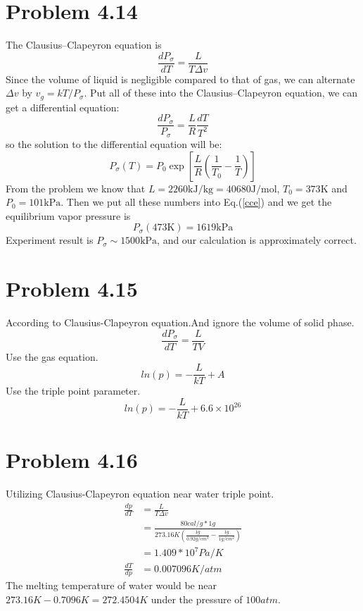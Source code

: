 \documentclass{article}
\begin{document}
\section*{Problem 4.14}
The Clausius–Clapeyron equation is
$$
\frac{dP_\sigma}{dT} = \frac{L}{T\Delta v}
$$
Since the volume of liquid is negligible compared to that of gas, we can alternate $\Delta v$ by $v_g = kT/P_\sigma$. Put all of these into the Clausius–Clapeyron equation, we can get a differential equation:
\begin{equation}
\frac{dP_\sigma}{P_\sigma} = \frac{L}{R}\frac{dT}{T^2}
\end{equation}
so the solution to the differential equation will be:
\begin{equation}\label{cce}
P_\sigma(T) = P_0\exp\left[\frac{L}{R}\left(\frac{1}{T_0}-\frac{1}{T}\right)\right]
\end{equation}
From the problem we know that $L = 2260\mathrm{kJ/kg} = 40680\mathrm{J/mol}$, $T_0 =373\mathrm{K}$ and $P_0 = 101\mathrm{kPa}$. Then we put all these numbers into Eq.(\ref{cce}) and we get the equilibrium vapor pressure is
$$
P_\sigma(473\mathrm{K}) = 1619\mathrm{kPa}
$$
Experiment result is $P_\sigma \sim 1500\mathrm{kPa}$, and our calculation is approximately correct.






\section*{Problem 4.15} %
\label{sec:problem_4_15}
	

	According to Clausius-Clapeyron equation.And ignore the volume of solid phase.
	$$\frac{dP_{\sigma}}{dT}=\frac{L}{TV}$$
	Use the gas equation.
	$$ln(p)=-\frac{L}{kT}+A$$
	Use the triple point parameter.
	$$ln(p)=-\frac{L}{kT}+6.6\times10^{26}$$

\section*{Problem 4.16}
	Utilizing Clausius-Clapeyron equation near water triple point.
	\begin{align}
		\frac{dp}{dT}&=\frac{L}{T\Delta v}\\
		&=\frac{80cal/g*1g}{273.16K (\frac{1g}{0.92g/cm^3}-\frac{1g}{1g/cm^2})}\\
		&=1.409*10^7 Pa/K\\
		\frac{dT}{dp}&=0.007096 K/atm
	\end{align}
	The melting temperature of water would be near $273.16K-0.7096K=272.4504K$ under the pressure of $100atm$.\\
\end{document}

